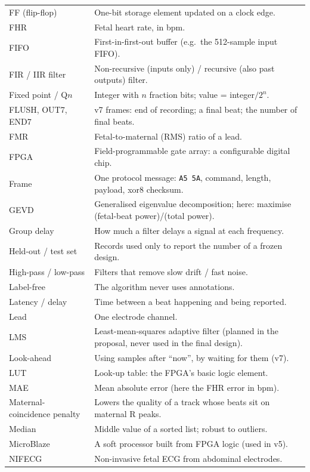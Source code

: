 \documentclass[11pt]{article}
\newcommand{\ttt}[1]{\texttt{#1}}
\begin{document}
{\begin{longtable}{@{}p{3.4cm} p{12.0cm}@{}}
FF (flip-flop) & One-bit storage element updated on a clock edge. \\
FHR & Fetal heart rate, in bpm. \\
FIFO & First-in-first-out buffer (e.g.\ the 512-sample input FIFO). \\
FIR / IIR filter & Non-recursive (inputs only) / recursive (also past outputs) filter. \\
Fixed point / Q$n$ & Integer with $n$ fraction bits; value = integer$/2^n$. \\
FLUSH, OUT7, END7 & v7 frames: end of recording; a final beat; the number of final beats. \\
FMR & Fetal-to-maternal (RMS) ratio of a lead. \\
FPGA & Field-programmable gate array: a configurable digital chip. \\
Frame & One protocol message: \ttt{A5 5A}, command, length, payload, xor8 checksum. \\
GEVD & Generalised eigenvalue decomposition; here: maximise (fetal-beat power)/(total power). \\
Group delay & How much a filter delays a signal at each frequency. \\
Held-out / test set & Records used only to report the number of a frozen design. \\
High-pass / low-pass & Filters that remove slow drift / fast noise. \\
Label-free & The algorithm never uses annotations. \\
Latency / delay & Time between a beat happening and being reported. \\
Lead & One electrode channel. \\
LMS & Least-mean-squares adaptive filter (planned in the proposal, never used in the final design). \\
Look-ahead & Using samples after ``now'', by waiting for them (v7). \\
LUT & Look-up table: the FPGA's basic logic element. \\
MAE & Mean absolute error (here the FHR error in bpm). \\
Maternal-coincidence penalty & Lowers the quality of a track whose beats sit on maternal R peaks. \\
Median & Middle value of a sorted list; robust to outliers. \\
MicroBlaze & A soft processor built from FPGA logic (used in v5). \\
NIFECG & Non-invasive fetal ECG from abdominal electrodes. \\

\end{longtable}}
\end{document}
